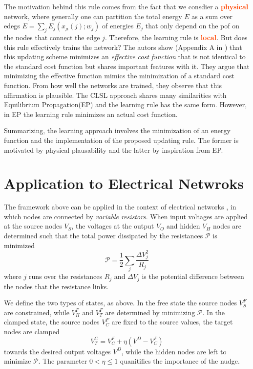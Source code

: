 \documentclass[10.5pt]{article}
\newcommand{\important}[1]{\textcolor{OrangeRed}{\bf{#1}}}
\begin{document}
The motivation behind this rule comes from the fact that we consdier a \important{physical} network, where generally one can partition the total energy $E$ as a sum over edegs $E = \sum_{j}E_{j}(x_{\mu}(j);w_j)$ of energies $E_j$ that only depend on the pof on the nodes that connect the edge $j$. Therefore, the learning rule is \important{local}. But does this rule effectively trains the network? The autors show (Appendix A in \cite{Stern}) that this updating scheme minimizes an \textit{effective cost function} that is not identical to the standard cost function but shares important features with it. They argue that minimizing the effective function mimics the minimization of a standard cost function. From how well the networks are trained, they observe that this affirmation is plausible. The CLSL approach shares many similarities with Equilibrium Propagation(EP) and the learning rule has the same form. However, in EP the learning rule minimizes an actual cost function.

Summarizing, the learning approach involves the minimization of an energy function and the implementation of the proposed updating rule. The former is motivated by physical plausability and the latter by inspiration from EP. %

\section{Application to Electrical Netwroks}

The framework above can be applied in the context of electrical networks \cite{Dillavou}, in which nodes are connected by \textit{variable resistors}. When input voltages are applied at the source nodes $V_{S}$, the voltages at the output $V_{O}$ and hidden $V_{H}$ nodes are determined such that the total power dissipated by the resistances $\mathcal{P}$ is minimized
\[
\mathcal{P}  = \frac{1}{2} \sum_{j} \frac{\Delta V_j^2}{R_j}   
\]
where $j$ runs over the resistances $R_j$ and $\Delta V_j$ is the potential difference between the nodes that the resistance links.

We define the two types of states, as above. In the free state the source nodes $V^{F}_{S}$ are constrained, while $V^{F}_{H}$ and $V^{F}_{T}$ are determined by minimizing $\mathcal{P}$. In the clamped state, the source nodes $V^{F}_{C}$ are fixed to the source values, the target nodes are clamped 
\[
V^{C}_{T} = V^{F}_{C} + \eta \left( V^{D} - V^{F}_{C} \right)   
\] 
towards the desired output voltages $V^D$, while the hidden nodes are left to minimize $\mathcal{P}$. The parameter $0 < \eta \le 1$ quanitifies the importance of the nudge.
\end{document}
